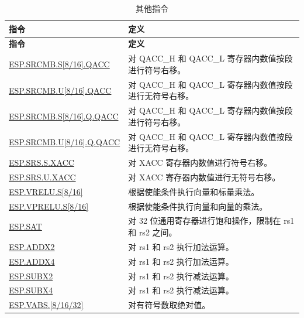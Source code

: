 \documentclass[main\_\_CN.tex]{subfiles}
\begin{document}
\begin{longtable}[c]{|l|m{10cm}|}
    \caption{其他指令}
    \label{tab:pie-others-instructions}\\
    \hline
    \rowcolor{lightgray}
    \textbf{指令} & \textbf{定义} \\\hline
    \endfirsthead
    \rowcolor{lightgray}
    \textbf{指令} & \textbf{定义} \\\hline
    \endhead
    \endfoot

    \hyperref[instruction:ESPSRCMBS8QACC]{ESP.SRCMB.S[8/16].QACC} & 对 QACC\_H 和 QACC\_L 寄存器内数值按段进行符号右移。
    \\\hline
    \hyperref[instruction:ESPSRCMBU8QACC]{ESP.SRCMB.U[8/16].QACC} & 对 QACC\_H 和 QACC\_L 寄存器内数值按段进行无符号右移。
    \\\hline
    \hyperref[instruction:ESPSRCMBS8QQACC]{ESP.SRCMB.S[8/16].Q.QACC} & 对 QACC\_H 和 QACC\_L 寄存器内数值按段进行符号右移。
    \\\hline
    \hyperref[instruction:ESPSRCMBU8QQACC]{ESP.SRCMB.U[8/16].Q.QACC} & 对 QACC\_H 和 QACC\_L 寄存器内数值按段进行无符号右移。
    \\\hline
    \hyperref[instruction:ESPSRSSXACC]{ESP.SRS.S.XACC} & 对 XACC 寄存器内数值进行符号右移。
    \\\hline
    \hyperref[instruction:ESPSRSUXACC]{ESP.SRS.U.XACC} & 对 XACC 寄存器内数值进行无符号右移。
    \\\hline
    \hyperref[instruction:ESPVRELUS8]{ESP.VRELU.S[8/16]} & 根据使能条件执行向量和标量乘法。
    \\\hline
    \hyperref[instruction:ESPVPRELUS8]{ESP.VPRELU.S[8/16]} & 根据使能条件执行向量和向量的乘法。
    \\\hline
    \hyperref[instruction:ESPSAT]{ESP.SAT} & 对 32 位通用寄存器进行饱和操作，限制在 rs1 和 rs2 之间。
    \\\hline
    \hyperref[instruction:ESPADDX2]{ESP.ADDX2} & 对 rs1 和 rs2 执行加法运算。
    \\\hline
    \hyperref[instruction:ESPADDX4]{ESP.ADDX4} & 对 rs1 和 rs2 执行加法运算。
    \\\hline
    \hyperref[instruction:ESPSUBX2]{ESP.SUBX2} & 对 rs1 和 rs2 执行减法运算。
    \\\hline
    \hyperref[instruction:ESPSUBX4]{ESP.SUBX4} & 对 rs1 和 rs2 执行减法运算。
    \\\hline
    \hyperref[instruction:ESPVABS8]{ESP.VABS.[8/16/32]} & 对有符号数取绝对值。
    \\\hline

\end{longtable}
\end{document}
